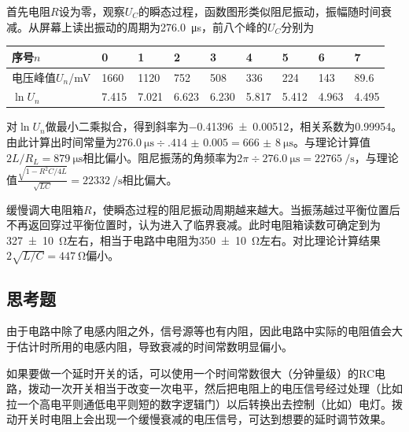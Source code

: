 \documentclass[UTF8]{ctexart}
\begin{document}
首先电阻$R$设为零，观察$U_C$的瞬态过程，函数图形类似阻尼振动，振幅随时间衰减。从屏幕上读出振动的周期为\SI{276.0}{\micro\second}，前八个峰的$U_C$分别为
\begin{center}
\begin{tabu}{X[c,-10]|X[c]X[c]X[c]X[c]X[c]X[c]X[c]X[c]}
\hline
序号$n$&0&1&2&3&4&5&6&7\\
\hline
电压峰值$U_n$/mV&1660&1120&752&508&336&224&143&89.6\\
$\ln U_n$&7.415&7.021&6.623&6.230&5.817&5.412&4.963&4.495\\
\hline
\end{tabu}
\end{center}
对$\ln U_n$做最小二乘拟合，得到斜率为\num{-0.41396(512)}，相关系数为\num{.99954}。由此计算出时间常量为$\SI{276.0}{\micro\s}\div\num{.414(5)}=\SI{666(8)}{\micro\second}$。与理论计算值$2L/R_L=\SI{879}{\micro\second}$相比偏小。阻尼振荡的角频率为$2\pi\div\SI{276.0}{\micro\second}=\SI{22765}{\per\second}$，与理论值$\frac{\sqrt{1-R^2C/4L}}{\sqrt{LC}}=\SI{22332}{\per\second}$相比偏大。

缓慢调大电阻箱$R$，使瞬态过程的阻尼振动周期越来越大。当振荡越过平衡位置后不再返回穿过平衡位置时，认为进入了临界衰减。此时电阻箱读数可确定到为\SI{327(10)}{\ohm}左右，相当于电路中电阻为\SI{350(10)}{\ohm}左右。对比理论计算结果$2\sqrt{L/C}=\SI{447}{\ohm}$偏小。

\subsection{思考题}
由于电路中除了电感内阻之外，信号源等也有内阻，因此电路中实际的电阻值会大于估计时所用的电感内阻，导致衰减的时间常数明显偏小。

如果要做一个延时开关的话，可以使用一个时间常数很大（分钟量级）的RC电路，拨动一次开关相当于改变一次电平，然后把电阻上的电压信号经过处理（比如拉一个高电平则通低电平则短的数字逻辑门）以后转换出去控制（比如）电灯。拨动开关时电阻上会出现一个缓慢衰减的电压信号，可达到想要的延时调节效果。
\end{document}

